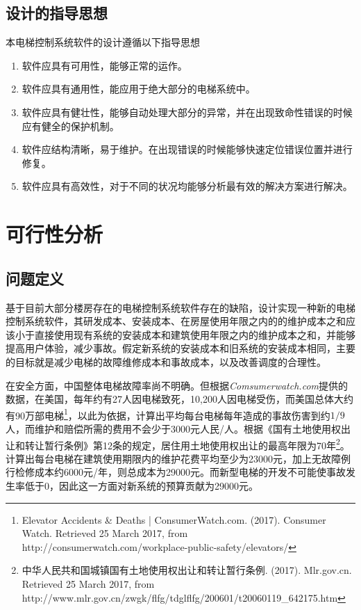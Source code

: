 \subsection{设计的指导思想}
本电梯控制系统软件的设计遵循以下指导思想
\begin{enumerate}
	\item 软件应具有可用性，能够正常的运作。
	\item 软件应具有通用性，能应用于绝大部分的电梯系统中。
	\item 软件应具有健壮性，能够自动处理大部分的异常，并在出现致命性错误的时候应有健全的保护机制。
	\item 软件应结构清晰，易于维护。在出现错误的时候能够快速定位错误位置并进行修复。
	\item 软件应具有高效性，对于不同的状况均能够分析最有效的解决方案进行解决。
\end{enumerate}

\newpage
\section{可行性分析}
\subsection{问题定义}
\label{define}
基于目前大部分楼房存在的电梯控制系统软件存在的缺陷，设计实现一种新的电梯控制系统软件，其研发成本、安装成本、在房屋使用年限之内的的维护成本之和应该小于直接使用现有系统的安装成本和建筑使用年限之内的维护成本之和，并能够提高用户体验，减少事故。假定新系统的安装成本和旧系统的安装成本相同，主要的目标就是减少电梯的故障维修成本和事故成本，以及改善调度的合理性。\par

在安全方面，中国整体电梯故障率尚不明确。但根据{\emph{Comsumerwatch.com}}提供的数据，在美国，每年约有27人因电梯致死，10,200人因电梯受伤，而美国总体大约有90万部电梯\footnote{Elevator Accidents \& Deaths |  ConsumerWatch.com. (2017). Consumer Watch. Retrieved 25 March 2017, from http://consumerwatch.com/workplace-public-safety/elevators/}，以此为依据，计算出平均每台电梯每年造成的事故伤害到约$1/9$人，而维护和赔偿所需的费用不会少于3000元人民/人。根据《国有土地使用权出让和转让暂行条例》第12条的规定，居住用土地使用权出让的最高年限为70年\footnote{中华人民共和国城镇国有土地使用权出让和转让暂行条例. (2017). Mlr.gov.cn. Retrieved 25 March 2017, from http://www.mlr.gov.cn/zwgk/flfg/tdglflfg/200601/t20060119\_642175.htm}。计算出每台电梯在建筑使用期限内的维护花费平均至少为23000元，加上无故障例行检修成本约6000元/年，则总成本为29000元。而新型电梯的开发不可能使事故发生率低于0，因此这一方面对新系统的预算贡献为29000元。\par

